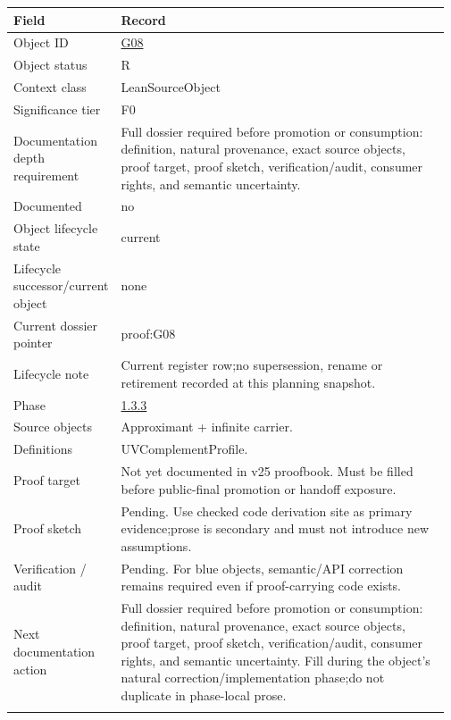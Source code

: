\begin{longtable}{L{0.16\linewidth} L{0.81\linewidth}}
\hline
\textbf{Field} & \textbf{Record}\\
\hline
Object ID & \hyperlink{object-row-G08}{G08}\\
\hline\addlinespace[0.20em]
Object status & R\\
\hline\addlinespace[0.20em]
Context class & LeanSourceObject\\
\hline\addlinespace[0.20em]
Significance tier & F0\\
\hline\addlinespace[0.20em]
Documentation depth requirement & Full dossier required before promotion or consumption: definition, natural provenance, exact source objects, proof target, proof sketch, verification/\allowbreak{}audit, consumer rights, and semantic uncertainty.\\
\hline\addlinespace[0.20em]
Documented & no\\
\hline\addlinespace[0.20em]
Object lifecycle state & current\\
\hline\addlinespace[0.20em]
Lifecycle successor/\allowbreak{}current object & none\\
\hline\addlinespace[0.20em]
Current dossier pointer & proof:G08\\
\hline\addlinespace[0.20em]
Lifecycle note & Current register row;\newline no supersession, rename or retirement recorded at this planning snapshot.\\
\hline\addlinespace[0.20em]
Phase & \hyperlink{phase-row-1-3-3}{1.3.3}\\
\hline\addlinespace[0.20em]
Source objects & Approximant + infinite carrier.\\
\hline\addlinespace[0.20em]
Definitions & UVComplementProfile.\\
\hline\addlinespace[0.20em]
Proof target & Not yet documented in v25 proofbook. Must be filled before public-final promotion or handoff exposure.\\
\hline\addlinespace[0.20em]
Proof sketch & Pending. Use checked code derivation site as primary evidence;\newline prose is secondary and must not introduce new assumptions.\\
\hline\addlinespace[0.20em]
Verification /\allowbreak{} audit & Pending. For blue objects, semantic/\allowbreak{}API correction remains required even if proof-carrying code exists.\\
\hline\addlinespace[0.20em]
Next documentation action & Full dossier required before promotion or consumption: definition, natural provenance, exact source objects, proof target, proof sketch, verification/\allowbreak{}audit, consumer rights, and semantic uncertainty. Fill during the object's natural correction/\allowbreak{}implementation phase;\newline do not duplicate in phase-local prose.\\
\hline\addlinespace[0.20em]
\end{longtable}
